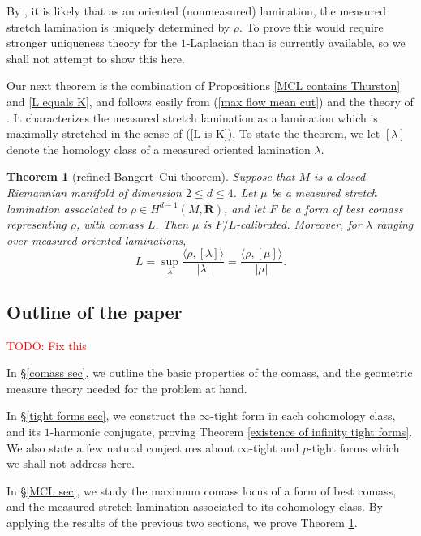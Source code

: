 \documentclass[reqno,11pt]{amsart}
\newcommand{\RR}{\mathbf{R}}
\newtheorem{mainthm}{Theorem}
\theoremstyle{definition}
\numberwithin{equation}{section}
\newcommand\todo[1]{\textcolor{red}{TODO: #1}}
\begin{document}
By \cite[Remark 2.8]{Mazon14}, it is likely that as an oriented (nonmeasured) lamination, the measured stretch lamination is uniquely determined by $\rho$.
To prove this would require stronger uniqueness theory for the $1$-Laplacian than is currently available, so we shall not attempt to show this here.

Our next theorem is the combination of Propositions \ref{MCL contains Thurston} and \ref{L equals K}, and follows easily from (\ref{max flow mean cut}) and the theory of \cite{BackusFLG, BackusCML}.
It characterizes the measured stretch lamination as a lamination which is maximally stretched in the sense of (\ref{L is K}).
To state the theorem, we let $[\lambda]$ denote the homology class of a measured oriented lamination $\lambda$.

\begin{mainthm}[refined Bangert--Cui theorem]\label{lams are calibrated}
Suppose that $M$ is a closed Riemannian manifold of dimension $2 \leq d \leq 4$.
Let $\mu$ be a measured stretch lamination associated to $\rho \in H^{d - 1}(M, \RR)$, and let $F$ be a form of best comass representing $\rho$, with comass $L$.
Then $\mu$ is $F/L$-calibrated.
Moreover, for $\lambda$ ranging over measured oriented laminations,
$$L = \sup_\lambda \frac{\langle \rho, [\lambda]\rangle}{|\lambda|} = \frac{\langle \rho, [\mu]\rangle}{|\mu|}.$$
\end{mainthm}



\subsection{Outline of the paper}
\todo{Fix this}

In \S\ref{comass sec}, we outline the basic properties of the comass, and the geometric measure theory needed for the problem at hand.

In \S\ref{tight forms sec}, we construct the $\infty$-tight form in each cohomology class, and its $1$-harmonic conjugate, proving Theorem \ref{existence of infinity tight forms}.
We also state a few natural conjectures about $\infty$-tight and $p$-tight forms which we shall not address here.

In \S\ref{MCL sec}, we study the maximum comass locus of a form of best comass, and the measured stretch lamination associated to its cohomology class.
By applying the results of the previous two sections, we prove Theorem \ref{lams are calibrated}.
\end{document}

